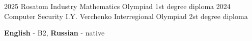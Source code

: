 \documentclass[10pt]{developercv}
\begin{document}
\vspace{-20 pt}
\vspace{-5 pt}
\begin{entrylist}
	\entry
		{2025}
		{Rosatom Industry Mathematics Olympiad}
        {}
		{1st degree diploma}
    \entry
		{2024}
		{Computer Security I.Y. Verchenko Interregional Olympiad}
        {}
		{2st degree diploma}
\end{entrylist}

\vspace{-20 pt}
    \vspace{-6pt}
    
    \hspace{26mm} \textbf{English} - B2, \textbf{ Russian} - native
\end{document}
